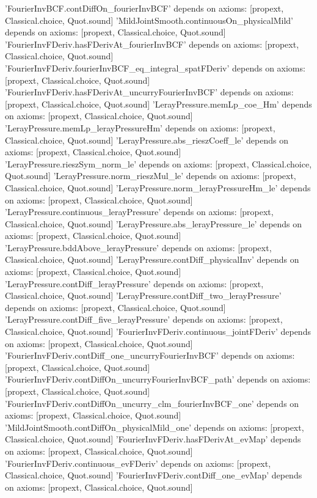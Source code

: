 \documentclass[11pt,a4paper]{article}
\theoremstyle{definition}
\theoremstyle{remark}
\begin{document}
\begin{leancode}
'FourierInvBCF.contDiffOn_fourierInvBCF' depends on axioms: [propext, Classical.choice, Quot.sound]
'MildJointSmooth.continuousOn_physicalMild' depends on axioms: [propext, Classical.choice, Quot.sound]
'FourierInvFDeriv.hasFDerivAt_fourierInvBCF' depends on axioms: [propext, Classical.choice, Quot.sound]
'FourierInvFDeriv.fourierInvBCF_eq_integral_spatFDeriv' depends on axioms: [propext, Classical.choice, Quot.sound]
'FourierInvFDeriv.hasFDerivAt_uncurryFourierInvBCF' depends on axioms: [propext, Classical.choice, Quot.sound]
'LerayPressure.memLp_coe_Hm' depends on axioms: [propext, Classical.choice, Quot.sound]
'LerayPressure.memLp_lerayPressureHm' depends on axioms: [propext, Classical.choice, Quot.sound]
'LerayPressure.abs_rieszCoeff_le' depends on axioms: [propext, Classical.choice, Quot.sound]
'LerayPressure.rieszSym_norm_le' depends on axioms: [propext, Classical.choice, Quot.sound]
'LerayPressure.norm_rieszMul_le' depends on axioms: [propext, Classical.choice, Quot.sound]
'LerayPressure.norm_lerayPressureHm_le' depends on axioms: [propext, Classical.choice, Quot.sound]
'LerayPressure.continuous_lerayPressure' depends on axioms: [propext, Classical.choice, Quot.sound]
'LerayPressure.abs_lerayPressure_le' depends on axioms: [propext, Classical.choice, Quot.sound]
'LerayPressure.bddAbove_lerayPressure' depends on axioms: [propext, Classical.choice, Quot.sound]
'LerayPressure.contDiff_physicalInv' depends on axioms: [propext, Classical.choice, Quot.sound]
'LerayPressure.contDiff_lerayPressure' depends on axioms: [propext, Classical.choice, Quot.sound]
'LerayPressure.contDiff_two_lerayPressure' depends on axioms: [propext, Classical.choice, Quot.sound]
'LerayPressure.contDiff_five_lerayPressure' depends on axioms: [propext, Classical.choice, Quot.sound]
'FourierInvFDeriv.continuous_jointFDeriv' depends on axioms: [propext, Classical.choice, Quot.sound]
'FourierInvFDeriv.contDiff_one_uncurryFourierInvBCF' depends on axioms: [propext, Classical.choice, Quot.sound]
'FourierInvFDeriv.contDiffOn_uncurryFourierInvBCF_path' depends on axioms: [propext, Classical.choice, Quot.sound]
'FourierInvFDeriv.contDiffOn_uncurry_clm_fourierInvBCF_one' depends on axioms: [propext, Classical.choice, Quot.sound]
'MildJointSmooth.contDiffOn_physicalMild_one' depends on axioms: [propext, Classical.choice, Quot.sound]
'FourierInvFDeriv.hasFDerivAt_evMap' depends on axioms: [propext, Classical.choice, Quot.sound]
'FourierInvFDeriv.continuous_evFDeriv' depends on axioms: [propext, Classical.choice, Quot.sound]
'FourierInvFDeriv.contDiff_one_evMap' depends on axioms: [propext, Classical.choice, Quot.sound]

\end{leancode}
\end{document}
